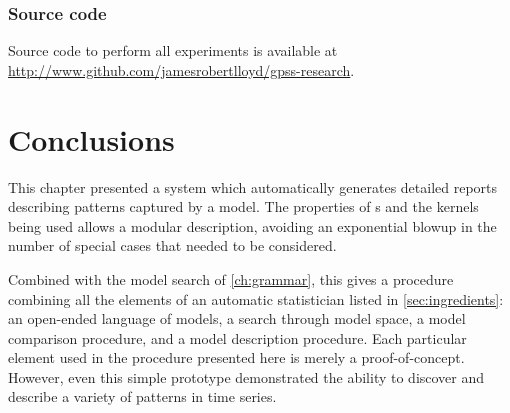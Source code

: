 \subsubsection{Source code}
Source code to perform all experiments is available at \\\url{http://www.github.com/jamesrobertlloyd/gpss-research}. 




\section{Conclusions}
This chapter presented a system which automatically generates detailed reports describing patterns captured by a \gp{} model.
The properties of \gp{}s and the kernels being used allows a modular description, avoiding an exponential blowup in the number of special cases that needed to be considered.

Combined with the model search of \cref{ch:grammar}, this gives a procedure combining all the elements of an automatic statistician listed in \cref{sec:ingredients}:
an open-ended language of models, a search through model space, a model comparison procedure, and a model description procedure.
Each particular element used in the procedure presented here is merely a proof-of-concept.
However, even this simple prototype demonstrated the ability to discover and describe a variety of patterns in time series.







\outbpdocument{


}


